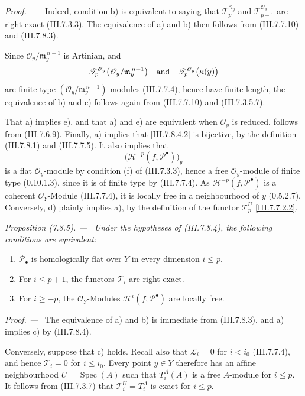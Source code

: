 \documentclass[10pt,oneside]{book}
\newcommand{\sh}[1]{\mathscr{#1}}
\newcommand{\kres}{\kappa}
\newcommand{\Spec}{\operatorname{Spec}}
\newcommand{\sref}[2][]{(#2)}
\newcommand{\oldpage}[2][]{\setcounter{footnote}{0}\marginpar{\scriptsize\textbf{#1}~|~#2}\ignorespaces}
\newenvironment{proposition}[1][]{\par\medskip\noindent\itshape Proposition (#1). ---\ }{\par}
\newenvironment{proof}{\par\medskip\noindent\textit{Proof. ---\ }}{\par}
\begin{document}
\begin{proof}
\oldpage[III]{206}
Indeed, condition b) is equivalent to saying that
$\sh{T}_p^{\sh{O}_y}$ and $\sh{T}_{p+1}^{\sh{O}_y}$ are
right exact \sref{III.7.3.3}.  The equivalence of a) and b)
then follows from \sref{III.7.7.10} and
\sref{III.7.8.3}.

Since $\sh{O}_y/\mathfrak m_y^{\,n+1}$ is Artinian, and
\[
  \sh{T}_p^{\sh{O}_y}
    \bigl(\sh{O}_y/\mathfrak m_y^{\,n+1}\bigr)
  \quad\hbox{and}\quad
  \sh{T}_p^{\sh{O}_y}\bigl(\kres(y)\bigr)
\]
are finite-type
$(\sh{O}_y/\mathfrak m_y^{\,n+1})$-modules
\sref{III.7.7.4}, hence have finite length, the equivalence
of b) and c) follows again from \sref{III.7.7.10} and
\sref{III.7.3.5.7}.

That a) implies e), and that a) and e) are equivalent when
$\sh{O}_y$ is reduced, follows from \sref{III.7.6.9}.
Finally, a) implies that \eqref{III.7.8.4.2} is bijective,
by the definition \sref{III.7.8.1} and
\sref{III.7.7.5}.  It also implies that
\[
  \bigl(\mathscr{H}^{-p}(f,\sh{P}^\bullet)\bigr)_y
\]
is a flat $\sh{O}_y$-module by condition (f) of
\sref{III.7.3.3}, hence a
free $\sh{O}_y$-module of finite type
\sref[0]{0.10.1.3}, since it is of finite type by
\sref{III.7.7.4}.  As
$\mathscr{H}^{-p}(f,\sh{P}^\bullet)$ is a coherent
$\sh{O}_Y$-Module \sref{III.7.7.4}, it is locally free in
a neighbourhood of $y$ \sref[0]{0.5.2.7}.
Conversely, d) plainly implies a), by the definition of the
functor $\sh{T}_p^U$ \eqref{III.7.7.2.2}.
\end{proof}

\begin{proposition}[7.8.5]
\label{III.7.8.5}
Under the hypotheses of \sref{III.7.8.4}, the following
conditions are equivalent:
\begin{enumerate}
  \item[a)] $\sh{P}_\bullet$ is homologically flat over $Y$
  in every dimension $i\leq p$.
  \item[b)] For $i\leq p+1$, the functors $\sh{T}_i$ are
  right exact.
  \item[c)] For $i\geq -p$, the $\sh{O}_Y$-Modules
  $\mathscr{H}^{i}(f,\sh{P}^\bullet)$ are locally free.
\end{enumerate}
\end{proposition}

\begin{proof}
The equivalence of a) and b) is immediate from
\sref{III.7.8.3}, and a) implies c) by
\sref{III.7.8.4}.

Conversely, suppose that c) holds.  Recall also that
$\sh{L}_i=0$ for $i<i_0$ \sref{III.7.7.4}, and hence
$\sh{T}_i=0$ for $i\leq i_0$.  Every point $y\in Y$
therefore has an affine neighbourhood
$U=\Spec(A)$ such that $T_i^A(A)$ is a free $A$-module for
$i\leq p$.  It follows from \sref{III.7.3.7} that
$\sh{T}_i^U=T_i^A$ is exact for $i\leq p$.
\end{proof}
\end{document}
